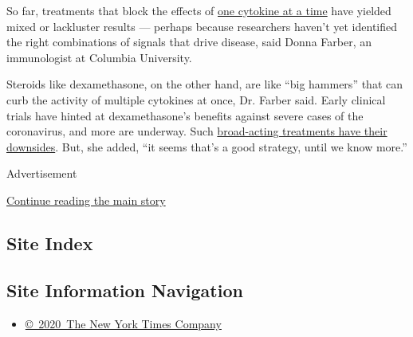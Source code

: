 So far, treatments that block the effects of
\href{https://www.nytimes3xbfgragh.onion/interactive/2020/science/coronavirus-drugs-treatments.html}{one
cytokine at a time} have yielded mixed or lackluster results --- perhaps
because researchers haven't yet identified the right combinations of
signals that drive disease, said Donna Farber, an immunologist at
Columbia University.

Steroids like dexamethasone, on the other hand, are like ``big hammers''
that can curb the activity of multiple cytokines at once, Dr. Farber
said. Early clinical trials have hinted at dexamethasone's benefits
against severe cases of the coronavirus, and more are underway. Such
\href{https://www.ncbi.nlm.nih.gov/pmc/articles/PMC7196557/}{broad-acting
treatments have their downsides}. But, she added, ``it seems that's a
good strategy, until we know more.''

Advertisement

\protect\hyperlink{after-bottom}{Continue reading the main story}

\hypertarget{site-index}{%
\subsection{Site Index}\label{site-index}}

\hypertarget{site-information-navigation}{%
\subsection{Site Information
Navigation}\label{site-information-navigation}}

\begin{itemize}
\tightlist
\item
  \href{https://help.nytimes3xbfgragh.onion/hc/en-us/articles/115014792127-Copyright-notice}{©~2020~The
  New York Times Company}
\end{itemize}

